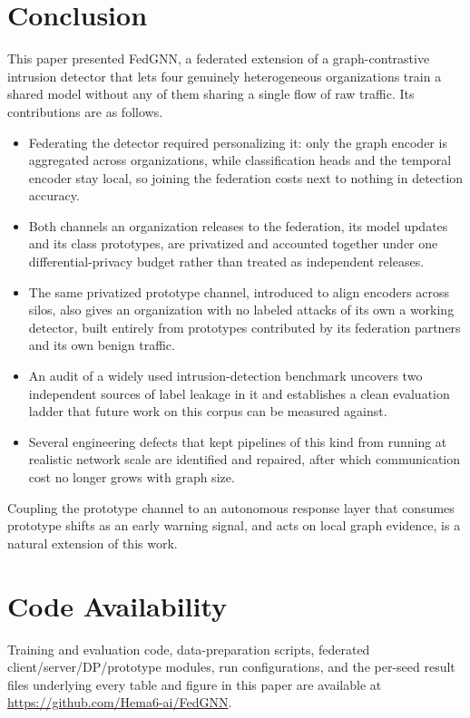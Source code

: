 \documentclass[journal]{IEEEtran}
\begin{document}
\section{Conclusion}
\label{sec:conclusion}
This paper presented FedGNN, a federated extension of a
graph-contrastive intrusion detector that lets four genuinely
heterogeneous organizations train a shared model without any of them
sharing a single flow of raw traffic. Its contributions are as
follows.

\begin{itemize}
\item Federating the detector required personalizing it: only the
graph encoder is aggregated across organizations, while classification
heads and the temporal encoder stay local, so joining the federation
costs next to nothing in detection accuracy.
\item Both channels an organization releases to the federation, its
model updates and its class prototypes, are privatized and accounted
together under one differential-privacy budget rather than treated as
independent releases.
\item The same privatized prototype channel, introduced to align
encoders across silos, also gives an organization with no labeled
attacks of its own a working detector, built entirely from prototypes
contributed by its federation partners and its own benign traffic.
\item An audit of a widely used intrusion-detection benchmark
uncovers two independent sources of label leakage in it and
establishes a clean evaluation ladder that future work on this corpus
can be measured against.
\item Several engineering defects that kept pipelines of this kind
from running at realistic network scale are identified and repaired,
after which communication cost no longer grows with graph size.
\end{itemize}

Coupling the prototype channel to an autonomous response layer that
consumes prototype shifts as an early warning signal, and acts on
local graph evidence, is a natural extension of this work.

\section*{Code Availability}
Training and evaluation code, data-preparation scripts, federated
client/server/DP/prototype modules, run configurations, and the
per-seed result files underlying every table and figure in this paper
are available at
\mbox{\url{https://github.com/Hema6-ai/FedGNN}}.
\end{document}
